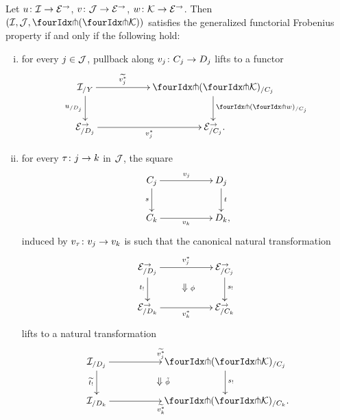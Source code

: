 \documentclass[reqno,10pt,a4paper,oneside,draft]{amsart}
\begin{document}
{{\begin{proposition} \label{def:uniFrobcond}
Let $u \co \cal{I} \to \catE^\to$, $v \co \cal{J} \to \cal{E}^\to$, $w \co \cal{K} \to \catE^\to$.
Then $(\cal{I}, \cal{J}, \liftl{(\liftr{\cal{K}})})$ satisfies the generalized functorial Frobenius property if and only if the following hold:
\begin{enumerate}[(i)]
\item for every $j \in \cal{J}$, pullback along $v_j \co C_j \to D_j$ lifts to a functor
\[
\xymatrix@C+3em{
  \cal{I}_{/Y}
  \ar[r]^-{\widetilde{v_j^*}}
  \ar[d]_-{u_{/D_j}}
&
  \liftl{(\liftr{\cal{K}})}_{/C_j}
  \ar[d]^-{\liftl{(\liftr{w})}_{/C_j}}
\\
  \catE_{/D_j}^\to \ar[r]_-{v_j^*}
&
  \catE_{/C_j}^\to
\rlap{.}}
\]
\item for every $\tau \co j \to k$ in $\cal{J}$, the square
\begin{equation} \label{def:beck-chevalley:0}
\begin{gathered}
\xymatrix@C+3em{
  C_j
  \ar[r]^{v_j}
  \ar[d]_{s}
&
  D_j
  \ar[d]^{t}
\\
  C_{k}
  \ar[r]_-{v_{k}}
&
  D_{k}
\rlap{,}}
\end{gathered}
\end{equation}
induced by $v_\tau \co v_j \to v_k$ is such that the canonical natural transformation
\[
\xymatrix@C+3em{
  \catE^\to_{/D_j}
  \ar[d]_{t_!}
  \ar[r]^{v_j^*}
  \ar@{}[dr]|{\textstyle\Downarrow \rlap{$\labelstyle\phi$}}
&
  \catE^\to_{/C_j}
  \ar[d]^{s_!}
\\
  \catE^\to_{/D_k}
  \ar[r]_{v_k^*}
&
  \catE^\to_{/C_k}
}
\]
lifts to a natural transformation
\[
\xymatrix@C+3em{
  \cal{I}_{/D_j}
  \ar[r]^{\widetilde{v_j^*}}
  \ar[d]_{\widetilde{t_!}}
  \ar@{}[dr]|{\textstyle\Downarrow \rlap{$\labelstyle\tilde{\phi}$}}
&
  \liftl{(\liftr{\cal{K}})}_{/C_j}
  \ar[d]^{s_!}
\\
  \cal{I}_{/D_k}
  \ar[r]_{\widetilde{v_k^*}}
&
  \liftl{(\liftr{\cal{K}})}_{/C_k}
\rlap{.}}
\]
\end{enumerate}
\end{proposition}

}}
\end{document}
